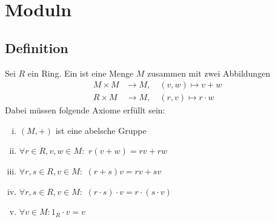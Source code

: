 \section{Moduln} %
\label{sec:14}

\subsection[Definition: $R$-Modul]{Definition} %
\label{141}
Sei $R$ ein Ring. Ein  ist eine Menge $M$ zusammen mit zwei Abbildungen 
\begin{align*}
	M \times M &\to M, \quad  (v,w) \mapsto v+w \\
	R \times M &\to M, \quad  (r,v) \mapsto r \cdot w
\end{align*} 
Dabei müssen folgende Axiome erfüllt sein:
\begin{enumerate}[(i)]
	\item $(M,+)$ ist eine abelsche Gruppe
	\item $\forall  r \in R, v,w \in M :$ $r(v+w) = r v + rw$
	\item $\forall r,s \in R, v \in M :$ $(r+s)v = rv + sv$
	\item $\forall r,s \in R, v \in M :$ $(r \cdot s) \cdot v = r \cdot (s \cdot v)$
	\item $\forall v \in M : 1_R \cdot v = v$
\end{enumerate}

